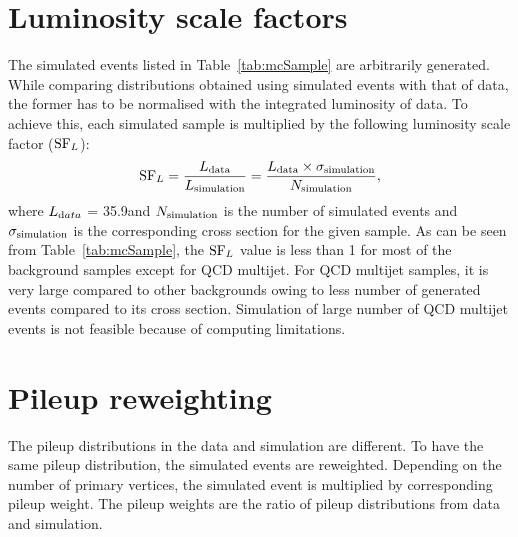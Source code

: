 \section{Luminosity scale factors}
\label{s:lumi_sf}

The simulated events listed in Table~\ref{tab:mcSample} are arbitrarily generated.
While comparing distributions obtained using simulated events with that of data, 
the former has to be normalised with the integrated luminosity of data.
To achieve this, each simulated sample is multiplied by the following luminosity scale 
factor ($\rm{SF}_{L}$):
\begin{equation}
\rm{SF}_{L}=\frac{L_{\rm {data}}}{L_{\rm {simulation}}} = \frac{L_{\rm {data}}\times\sigma_{\rm {simulation}}}{N_{\rm {simulation}}},
\label{eq:lumiSF}
\end{equation}
where $L_{\rm data}$ = 35.9\fbinv and $N_{\rm {simulation}}$ is the number of 
simulated events and $\sigma_{\rm {simulation}}$ is the corresponding cross section for 
the given sample. As can be seen from Table~\ref{tab:mcSample}, the $\rm{SF}_{L}$ value is less 
than 1 for most of the background samples except for QCD multijet. For QCD multijet samples, 
it is very large compared to other backgrounds owing to less number of generated events compared 
to its cross section. Simulation of large number of QCD multijet events is not feasible because of 
computing limitations.  

\section{Pileup reweighting}
\label{s:pileup_reweighting}
The pileup distributions in the data and simulation are different. To have the
same pileup distribution, the simulated events are reweighted. Depending on 
the number of primary vertices, the simulated event is multiplied by corresponding 
pileup weight. The pileup weights are the ratio of pileup distributions from 
data and simulation. 

